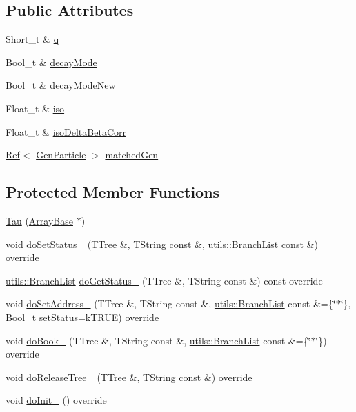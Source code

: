 \subsection*{Public Attributes}
\begin{DoxyCompactItemize}
\item 
Short\_\-t \& \hyperlink{classpanda_1_1Tau_a70d2cb37c2bc4ed1e17db5725b727389}{q}
\item 
Bool\_\-t \& \hyperlink{classpanda_1_1Tau_a66dff67292b497ccc8d1ff461daab550}{decayMode}
\item 
Bool\_\-t \& \hyperlink{classpanda_1_1Tau_ac7515cf0cc6b9dd2f93ceed30c8ec7a3}{decayModeNew}
\item 
Float\_\-t \& \hyperlink{classpanda_1_1Tau_a7ee0e9781f98acefca2eb8caa266329b}{iso}
\item 
Float\_\-t \& \hyperlink{classpanda_1_1Tau_aee6992ff035351edcb1cf8cb3d9e8f31}{isoDeltaBetaCorr}
\item 
\hyperlink{classpanda_1_1Ref}{Ref}$<$ \hyperlink{classpanda_1_1GenParticle}{GenParticle} $>$ \hyperlink{classpanda_1_1Tau_ab7eeac10774a2e9c7c5920ac360c034b}{matchedGen}
\end{DoxyCompactItemize}
\subsection*{Protected Member Functions}
\begin{DoxyCompactItemize}
\item 
\hyperlink{classpanda_1_1Tau_a5c3641c6492f8403ba8a19d74ad3da75}{Tau} (\hyperlink{classpanda_1_1ArrayBase}{ArrayBase} $\ast$)
\item 
void \hyperlink{classpanda_1_1Tau_a96eda4638f1fd6968f3a31757253600e}{doSetStatus\_\-} (TTree \&, TString const \&, \hyperlink{classpanda_1_1utils_1_1BranchList}{utils::BranchList} const \&) override
\item 
\hyperlink{classpanda_1_1utils_1_1BranchList}{utils::BranchList} \hyperlink{classpanda_1_1Tau_ad81f7bd9caddfbc5773bd20f5f4a227f}{doGetStatus\_\-} (TTree \&, TString const \&) const override
\item 
void \hyperlink{classpanda_1_1Tau_a49f42dffab89a0699caff1da8d7993ed}{doSetAddress\_\-} (TTree \&, TString const \&, \hyperlink{classpanda_1_1utils_1_1BranchList}{utils::BranchList} const \&=\{\char`\"{}$\ast$\char`\"{}\}, Bool\_\-t setStatus=kTRUE) override
\item 
void \hyperlink{classpanda_1_1Tau_a223ddb7af7f072bdb8973676cdb69004}{doBook\_\-} (TTree \&, TString const \&, \hyperlink{classpanda_1_1utils_1_1BranchList}{utils::BranchList} const \&=\{\char`\"{}$\ast$\char`\"{}\}) override
\item 
void \hyperlink{classpanda_1_1Tau_a5e28b6235042855a3e9d3b613c5145e5}{doReleaseTree\_\-} (TTree \&, TString const \&) override
\item 
void \hyperlink{classpanda_1_1Tau_aed759d7cf1b0e0e47fb34f646e899e5c}{doInit\_\-} () override
\end{DoxyCompactItemize}


